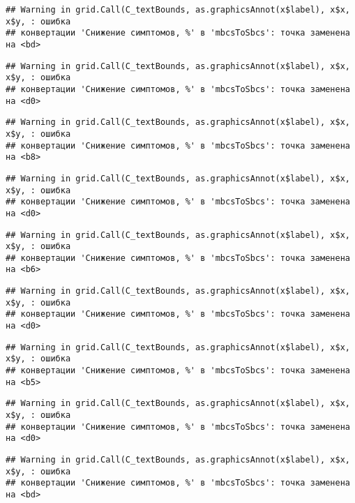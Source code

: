 \documentclass[
]{article}
\begin{document}
\begin{verbatim}
## Warning in grid.Call(C_textBounds, as.graphicsAnnot(x$label), x$x, x$y, : ошибка
## конвертации 'Снижение симптомов, %' в 'mbcsToSbcs': точка заменена на <bd>
\end{verbatim}

\begin{verbatim}
## Warning in grid.Call(C_textBounds, as.graphicsAnnot(x$label), x$x, x$y, : ошибка
## конвертации 'Снижение симптомов, %' в 'mbcsToSbcs': точка заменена на <d0>
\end{verbatim}

\begin{verbatim}
## Warning in grid.Call(C_textBounds, as.graphicsAnnot(x$label), x$x, x$y, : ошибка
## конвертации 'Снижение симптомов, %' в 'mbcsToSbcs': точка заменена на <b8>
\end{verbatim}

\begin{verbatim}
## Warning in grid.Call(C_textBounds, as.graphicsAnnot(x$label), x$x, x$y, : ошибка
## конвертации 'Снижение симптомов, %' в 'mbcsToSbcs': точка заменена на <d0>
\end{verbatim}

\begin{verbatim}
## Warning in grid.Call(C_textBounds, as.graphicsAnnot(x$label), x$x, x$y, : ошибка
## конвертации 'Снижение симптомов, %' в 'mbcsToSbcs': точка заменена на <b6>
\end{verbatim}

\begin{verbatim}
## Warning in grid.Call(C_textBounds, as.graphicsAnnot(x$label), x$x, x$y, : ошибка
## конвертации 'Снижение симптомов, %' в 'mbcsToSbcs': точка заменена на <d0>
\end{verbatim}

\begin{verbatim}
## Warning in grid.Call(C_textBounds, as.graphicsAnnot(x$label), x$x, x$y, : ошибка
## конвертации 'Снижение симптомов, %' в 'mbcsToSbcs': точка заменена на <b5>
\end{verbatim}

\begin{verbatim}
## Warning in grid.Call(C_textBounds, as.graphicsAnnot(x$label), x$x, x$y, : ошибка
## конвертации 'Снижение симптомов, %' в 'mbcsToSbcs': точка заменена на <d0>
\end{verbatim}

\begin{verbatim}
## Warning in grid.Call(C_textBounds, as.graphicsAnnot(x$label), x$x, x$y, : ошибка
## конвертации 'Снижение симптомов, %' в 'mbcsToSbcs': точка заменена на <bd>
\end{verbatim}
\end{document}
